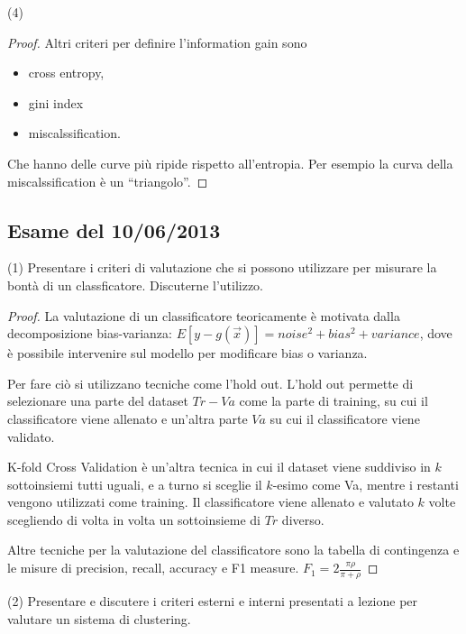 \documentclass[12pt,a4paper,oneside]{book}
\begin{document}
\begin{exercise}{(4)}
\begin{proof}
        Altri criteri per definire l'information gain sono
        \begin{itemize}
            \item cross entropy,
            \item gini index
            \item miscalssification.
        \end{itemize}
        Che hanno delle curve più ripide rispetto all'entropia. Per
        esempio la curva della miscalssification è un ``triangolo''.
    \end{proof}
\end{exercise}

\subsection{Esame del 10/06/2013}

\begin{exercise}{(1)}
    Presentare i criteri di valutazione che si possono utilizzare per
    misurare la bontà di un classficatore. Discuterne l'utilizzo.
    
    \begin{proof}
    	La valutazione di un classificatore teoricamente è motivata dalla decomposizione bias-varianza: $E [y - g(\vec{x})] = noise^2 + bias^2 + variance$, dove è possibile intervenire sul modello per modificare bias o varianza.
    	
    	Per fare ciò si utilizzano tecniche come l'hold out. L'hold out permette di selezionare una parte del dataset $Tr - Va$ come la parte di training, su cui il classificatore viene allenato e un'altra parte $Va$ su cui il classificatore viene validato.
    	
    	K-fold Cross Validation è un'altra tecnica in cui il dataset viene suddiviso in $k$ sottoinsiemi tutti uguali, e a turno si sceglie il $k$-esimo come Va, mentre i restanti vengono utilizzati come training. Il classificatore viene allenato e valutato $k$ volte scegliendo di volta in volta un sottoinsieme di $Tr$ diverso.
    	
    	Altre tecniche per la valutazione del classificatore sono la tabella di contingenza e le misure di precision, recall, accuracy e F1 measure. $F_1 = 2 \frac{\pi \rho}{\pi + \rho}$
    \end{proof}
\end{exercise}

\begin{exercise}{(2)}
    Presentare e discutere i criteri esterni e interni presentati a
    lezione per valutare un sistema di clustering.
\end{exercise}
\end{document}
